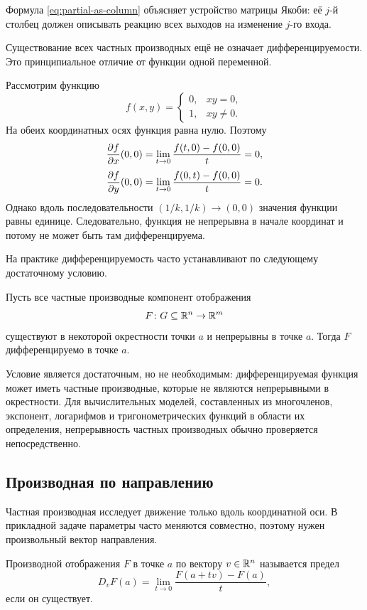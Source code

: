 Формула \eqref{eq:partial-as-column} объясняет устройство матрицы Якоби: её \(j\)-й столбец должен описывать реакцию всех выходов на изменение \(j\)-го входа.

Существование всех частных производных ещё не означает дифференцируемости. Это принципиальное отличие от функции одной переменной.

\begin{counterexample}[по В.~А.~Зоричу]
Рассмотрим функцию
\[
f(x,y)
=
\begin{cases}
0, & xy=0,\\
1, & xy\neq0.
\end{cases}
\]
На обеих координатных осях функция равна нулю. Поэтому
\[
\frac{\partial f}{\partial x}(0,0)
=
\lim_{t\to0}\frac{f(t,0)-f(0,0)}{t}=0,
\]
\[
\frac{\partial f}{\partial y}(0,0)
=
\lim_{t\to0}\frac{f(0,t)-f(0,0)}{t}=0.
\]
Однако вдоль последовательности \((1/k,1/k)\to(0,0)\) значения функции равны единице. Следовательно, функция не непрерывна в начале координат и потому не может быть там дифференцируема.
\end{counterexample}

На практике дифференцируемость часто устанавливают по следующему достаточному условию.

\begin{theorem}
Пусть все частные производные компонент отображения
\[
F\colon G\subseteq\mathbb{R}^n\to\mathbb{R}^m
\]
существуют в некоторой окрестности точки \(a\) и непрерывны в точке \(a\). Тогда \(F\) дифференцируемо в точке \(a\).
\end{theorem}

Условие является достаточным, но не необходимым: дифференцируемая функция может иметь частные производные, которые не являются непрерывными в окрестности. Для вычислительных моделей, составленных из многочленов, экспонент, логарифмов и тригонометрических функций в области их определения, непрерывность частных производных обычно проверяется непосредственно.

\subsection{Производная по направлению}

Частная производная исследует движение только вдоль координатной оси. В прикладной задаче параметры часто меняются совместно, поэтому нужен произвольный вектор направления.

\begin{definition}
Производной отображения \(F\) в точке \(a\) по вектору \(v\in\mathbb{R}^n\) называется предел
\begin{equation}
D_vF(a)
=
\lim_{t\to0}
\frac{F(a+t v)-F(a)}{t},
\label{eq:directional-derivative}
\end{equation}
если он существует.
\end{definition}

